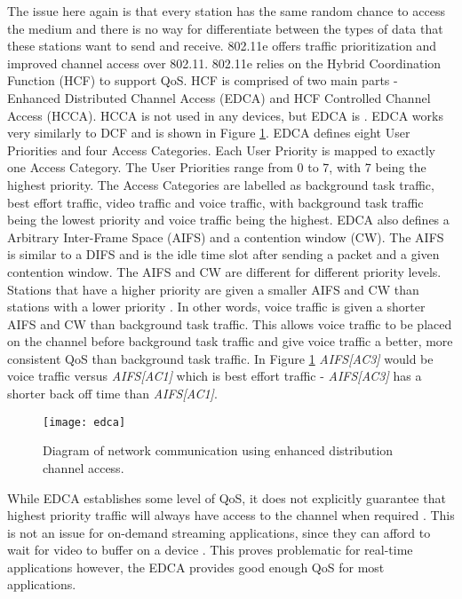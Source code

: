 \documentclass[12pt]{article}
\begin{document}
The issue here again is that every station has the same random chance to access the medium and there is no way for differentiate between the types of data that these stations want to send and receive.  802.11e offers traffic prioritization and improved channel access over 802.11.  802.11e relies on the Hybrid Coordination Function (HCF) to support QoS.  HCF is comprised of two main parts - Enhanced Distributed Channel Access (EDCA) and  HCF Controlled Channel Access (HCCA).  HCCA is not used in any devices, but EDCA is \cite{Thottan:2006:IEM:1234161.1234187}.  EDCA works very similarly to DCF and is shown in Figure \ref{fig:edca}.  EDCA defines eight User Priorities and four Access Categories.  Each User Priority is mapped to exactly one Access Category.  The User Priorities range from 0 to 7, with 7 being the highest priority.  The Access Categories are labelled as background task traffic, best effort traffic, video traffic and voice traffic, with background task traffic being the lowest priority and voice traffic being the highest.  EDCA also defines a Arbitrary Inter-Frame Space (AIFS) and a contention window (CW).  The AIFS is similar to a DIFS and is the idle time slot after sending a packet and a given contention window.  The AIFS and CW are different for different priority levels.  Stations that have a higher priority are given a smaller AIFS and CW than stations with a lower priority \cite{7434292}.  In other words, voice traffic is given a shorter AIFS and CW than background task traffic.  This allows voice traffic to be placed on the channel before background task traffic and give voice traffic a better, more consistent QoS than background task traffic.  In Figure \ref{fig:edca} \textit{AIFS[AC3]} would be voice traffic versus \textit{AIFS[AC1]} which is best effort traffic - \textit{AIFS[AC3]} has a shorter back off time than \textit{AIFS[AC1]}.

\begin{figure}[htp]
  \begin{center}
    \texttt{[image: edca]}
    \caption{Diagram of network communication using enhanced distribution channel access.}
    \label{fig:edca}
  \end{center}
\end{figure}

While EDCA establishes some level of QoS, it does not explicitly guarantee that highest priority traffic will always have access to the channel when required \cite{Thottan:2006:IEM:1234161.1234187}.  This is not an issue for on-demand streaming applications, since they can afford to wait for video to buffer on a device \cite{ciscoqos}.  This proves problematic for real-time applications \cite{5336865} however, the EDCA provides good enough QoS for most applications.
\end{document}
